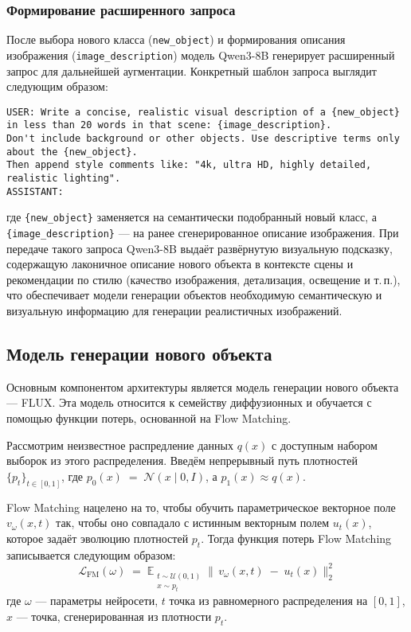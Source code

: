 \subsubsection{Формирование расширенного запроса}
После выбора нового класса (\texttt{new\_object}) и формирования описания изображения (\texttt{image\_description}) модель Qwen3-8B\cite{yang2025qwen3technicalreport} генерирует расширенный запрос для дальнейшей аугментации. Конкретный шаблон запроса выглядит следующим образом:
\begin{verbatim}
USER: Write a concise, realistic visual description of a {new_object} 
in less than 20 words in that scene: {image_description}. 
Don't include background or other objects. Use descriptive terms only 
about the {new_object}. 
Then append style comments like: "4k, ultra HD, highly detailed, 
realistic lighting". 
ASSISTANT:
\end{verbatim}
где \texttt{\{new\_object\}} заменяется на семантически подобранный новый класс, а \texttt{\{image\_description\}} — на ранее сгенерированное описание изображения. При передаче такого запроса Qwen3-8B выдаёт развёрнутую визуальную подсказку, содержащую лаконичное описание нового объекта в контексте сцены и рекомендации по стилю (качество изображения, детализация, освещение и т.\,п.), что обеспечивает модели генерации объектов необходимую семантическую и визуальную информацию для генерации реалистичных изображений.


\subsection{Модель генерации нового объекта}

Основным компонентом архитектуры является модель генерации нового объекта — FLUX\cite{flux2024}. Эта модель относится к семейству диффузионных и обучается с помощью функции потерь, основанной на Flow Matching\cite{lipman2023flowmatchinggenerativemodeling}.

Рассмотрим неизвестное распредление данных \(q(x)\) с доступным набором выборок из этого распределения. Введём непрерывный путь плотностей \(\{p_t\}_{t\in[0,1]}\), где  
$p_0(x) \;=\; \mathcal{N}(x\mid 0, I)$, а \(p_1(x)\approx q(x)\).

Flow Matching нацелено на то, чтобы обучить параметрическое векторное поле \(v_\omega(x,t)\) так, чтобы оно совпадало с истинным векторным полем \(u_t(x)\), которое задаёт эволюцию плотностей \(p_t\).
Тогда функция потерь Flow Matching записывается следующим образом:
\[
\mathcal{L}_{\mathrm{FM}}(\omega)
\;=\;
\mathbb{E}_{\substack{t\sim \mathcal{U}(0,1) \\ x\sim p_t}}
\bigl\|\,v_\omega(x,t)\;-\;u_t(x)\bigr\|^2_2
\]
где \(\omega\) — параметры нейросети, \(t\) точка из равномерного распределения на \([0,1]\), \(x\) — точка, сгенерированная из плотности \(p_t\).

